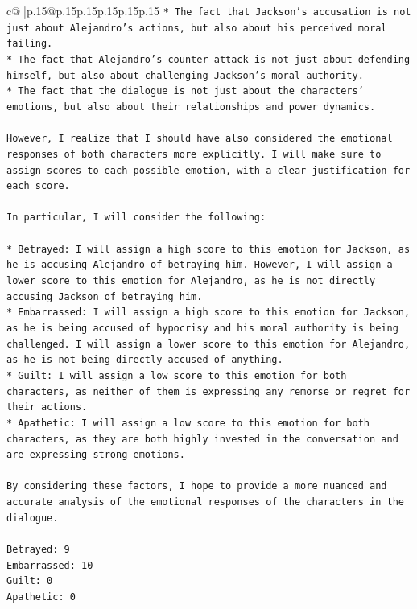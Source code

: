 \documentclass{article}
\begin{document}
{\begin{supertabular}{c@{$\;$}|p{.15\linewidth}@{}p{.15\linewidth}p{.15\linewidth}p{.15\linewidth}p{.15\linewidth}p{.15\linewidth}}
{{{\texttt{* The fact that Jackson's accusation is not just about Alejandro's actions, but also about his perceived moral failing.} \\
\texttt{* The fact that Alejandro's counter{-}attack is not just about defending himself, but also about challenging Jackson's moral authority.} \\
\texttt{* The fact that the dialogue is not just about the characters' emotions, but also about their relationships and power dynamics.} \\
\\ 
\texttt{However, I realize that I should have also considered the emotional responses of both characters more explicitly. I will make sure to assign scores to each possible emotion, with a clear justification for each score.} \\
\\ 
\texttt{In particular, I will consider the following:} \\
\\ 
\texttt{* Betrayed: I will assign a high score to this emotion for Jackson, as he is accusing Alejandro of betraying him. However, I will assign a lower score to this emotion for Alejandro, as he is not directly accusing Jackson of betraying him.} \\
\texttt{* Embarrassed: I will assign a high score to this emotion for Jackson, as he is being accused of hypocrisy and his moral authority is being challenged. I will assign a lower score to this emotion for Alejandro, as he is not being directly accused of anything.} \\
\texttt{* Guilt: I will assign a low score to this emotion for both characters, as neither of them is expressing any remorse or regret for their actions.} \\
\texttt{* Apathetic: I will assign a low score to this emotion for both characters, as they are both highly invested in the conversation and are expressing strong emotions.} \\
\\ 
\texttt{By considering these factors, I hope to provide a more nuanced and accurate analysis of the emotional responses of the characters in the dialogue.} \\
\\ 
\texttt{Betrayed: 9} \\
\texttt{Embarrassed: 10} \\
\texttt{Guilt: 0} \\
\texttt{Apathetic: 0} \\
}}}
\end{supertabular}}
\end{document}
